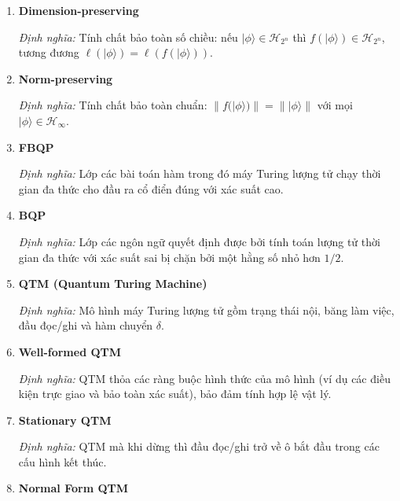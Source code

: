 \documentclass[12pt,a4paper]{article}
\begin{document}
\begin{enumerate}[leftmargin=*,itemsep=0.8em]
\textit{Đặc điểm chính:}
\begin{itemize}[leftmargin=1.5em]
\item Có thể thay đổi chuẩn và kích thước trạng thái.
\item Làm mất tính khả nghịch.
\item Vì vậy không thuộc lớp $\widehat{\square_{1}^{\mathrm{QP}}}$.
\end{itemize}

\item \textbf{Dimension-preserving}

\textit{Định nghĩa:} Tính chất bảo toàn số chiều: nếu $|\phi\rangle\in\mathcal{H}_{2^n}$ thì $f(|\phi\rangle)\in\mathcal{H}_{2^n}$, tương đương $\ell(|\phi\rangle)=\ell(f(|\phi\rangle))$.

\item \textbf{Norm-preserving}

\textit{Định nghĩa:} Tính chất bảo toàn chuẩn: $\|f(|\phi\rangle)\|=\||\phi\rangle\|$ với mọi $|\phi\rangle\in\mathcal{H}_{\infty}$.

\item \textbf{FBQP}

\textit{Định nghĩa:} Lớp các bài toán hàm trong đó máy Turing lượng tử chạy thời gian đa thức cho đầu ra cổ điển đúng với xác suất cao.

\item \textbf{BQP}

\textit{Định nghĩa:} Lớp các ngôn ngữ quyết định được bởi tính toán lượng tử thời gian đa thức với xác suất sai bị chặn bởi một hằng số nhỏ hơn $1/2$.

\item \textbf{QTM (Quantum Turing Machine)}

\textit{Định nghĩa:} Mô hình máy Turing lượng tử gồm trạng thái nội, băng làm việc, đầu đọc/ghi và hàm chuyển $\delta$.

\item \textbf{Well-formed QTM}

\textit{Định nghĩa:} QTM thỏa các ràng buộc hình thức của mô hình (ví dụ các điều kiện trực giao và bảo toàn xác suất), bảo đảm tính hợp lệ vật lý.

\item \textbf{Stationary QTM}

\textit{Định nghĩa:} QTM mà khi dừng thì đầu đọc/ghi trở về ô bắt đầu trong các cấu hình kết thúc.

\item \textbf{Normal Form QTM}


\end{enumerate}
\end{document}
